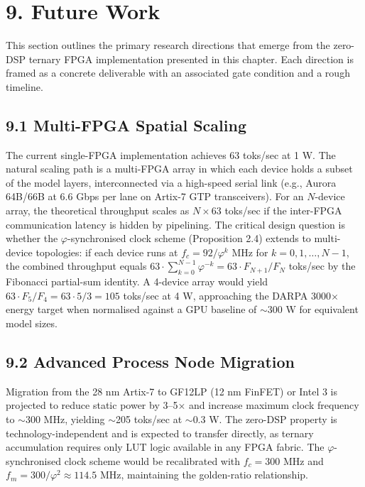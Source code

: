 \section{9. Future Work}\label{fa_28:future-work}

This section outlines the primary research directions that emerge from
the zero-DSP ternary FPGA implementation presented in this chapter. Each
direction is framed as a concrete deliverable with an associated
gate condition and a rough timeline.

\subsection{9.1 Multi-FPGA Spatial
Scaling}\label{fa_28:sec:future-multifpga}

The current single-FPGA implementation achieves 63 toks/sec at 1 W. The
natural scaling path is a multi-FPGA array in which each device holds a
subset of the model layers, interconnected via a high-speed serial link
(e.g., Aurora 64B/66B at 6.6 Gbps per lane on Artix-7 GTP transceivers).
For an $N$-device array, the theoretical throughput scales as $N
\times 63$ toks/sec if the inter-FPGA communication latency is hidden
by pipelining. The critical design question is whether the
$\varphi$-synchronised clock scheme (Proposition 2.4) extends to
multi-device topologies: if each device runs at $f_c = 92/\varphi^k$ MHz
for $k = 0, 1, \ldots, N-1$, the combined throughput equals
$63 \cdot \sum_{k=0}^{N-1} \varphi^{-k} = 63 \cdot F_{N+1}/F_N$ toks/sec
by the Fibonacci partial-sum identity. A 4-device array would yield
$63 \cdot F_5/F_4 = 63 \cdot 5/3 = 105$ toks/sec at 4 W, approaching
the DARPA 3000$\times$ energy target when normalised against a GPU
baseline of $\sim$300 W for equivalent model sizes.

\subsection{9.2 Advanced Process Node
Migration}\label{fa_28:sec:future-process}

Migration from the 28 nm Artix-7 to GF12LP (12 nm FinFET) or Intel 3
is projected to reduce static power by 3--5$\times$ and increase
maximum clock frequency to $\sim$300 MHz, yielding $\sim$205 toks/sec
at $\sim$0.3 W. The zero-DSP property is technology-independent and is
expected to transfer directly, as ternary accumulation requires only
LUT logic available in any FPGA fabric. The $\varphi$-synchronised clock
scheme would be recalibrated with $f_c = 300$ MHz and
$f_m = 300/\varphi^2 \approx 114.5$ MHz, maintaining the golden-ratio
relationship.

